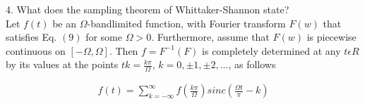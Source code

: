 \documentclass[10pt,a4paper]{article}
\begin{document}
\begin{flushleft}
4. What does the sampling theorem of Whittaker-Shannon state?  \\[1\baselineskip]
Let $f(t)$ be an $\Omega$-bandlimited function, with Fourier transform $F(w)$ that satisfies Eq. $(9)$ for some $\Omega > 0$. Furthermore, assume that $F(w)$ is piecewise continuous on $[-\Omega, \Omega]$. Then $f = F^{-1}(F)$ is completely determined at any $t \epsilon R$ by its values at the points $tk = \frac{k\pi}{\Omega} $, $k = 0, \pm1, \pm2, ... $, as follows

\begin{gather*}
f(t) = \displaystyle\sum_{k=-\infty}^{\infty} f (\frac{k\pi}{\Omega}) sinc ( \frac{\Omega t}{\pi} - k )
\end{gather*}

\end{flushleft}
\end{document}
